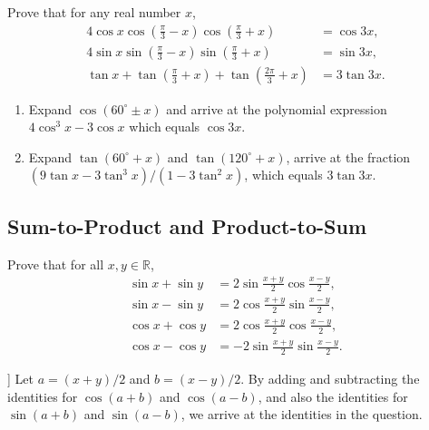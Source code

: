 \documentclass[12pt,a4paper]{memoir}
\theoremstyle{definition}
\begin{document}
\begin{question}
	Prove that for any real number $x$,
	\begin{align*}
		4\cos x \cos\left(\frac{\pi}{3}-x\right)\cos\left(\frac{\pi}{3}+x\right) &= \cos 3x,\\
		4\sin x \sin\left(\frac{\pi}{3}-x\right)\sin\left(\frac{\pi}{3}+x\right) &= \sin 3x,\\
		\tan x + \tan\left(\frac{\pi}{3}+x\right)+ \tan\left(\frac{2\pi}{3}+x\right) &= 3 \tan 3x.
	\end{align*}
\end{question}

\begin{solution}
	\begin{enumerate}
		\item Expand $\cos(60^\circ \pm x)$ and arrive at the polynomial expression $4\cos^3 x - 3\cos x$ which equals $\cos 3x$. 
		\item Expand $\tan(60^\circ + x)$ and $\tan(120^\circ + x)$, arrive at the fraction $(9\tan x - 3\tan^3 x)/(1-3\tan^2 x)$, which equals $3\tan 3x$.
	\end{enumerate}
\end{solution}

\newpage
\subsection{Sum-to-Product and Product-to-Sum}



	\begin{question}[name=Sine and Cosine Sum-to-Product]
		Prove that for all $x,y\in \mathbb R$,
		\begin{align}
			\sin x + \sin y &= 2 \sin \frac{x+y}{2} \cos \frac{x-y}{2}, \label{id:sin-sum-to-product} \\
			\sin x - \sin y &= 2 \cos \frac{x+y}{2} \sin \frac{x-y}{2}, \label{id:sin-difference-to-product} \\
			\cos x + \cos y &= 2 \cos \frac{x+y}{2} \cos \frac{x-y}{2}, \label{id:cos-sum-to-product} \\
			\cos x - \cos y &= -2 \sin \frac{x+y}{2} \sin \frac{x-y}{2}. \label{id:cos-difference-to-product} 
		\end{align}
	\end{question}


\begin{solution}[name=Proof of Sine and Cosine Sum-to-Product]]
	Let $a=(x+y)/2$ and $b=(x-y)/2$. By adding and subtracting the identities for $\cos(a+b)$ and $\cos(a-b)$, and also the identities for $\sin(a+b)$ and $\sin(a-b)$, we arrive at the identities in the question.
\end{solution}
\end{document}
